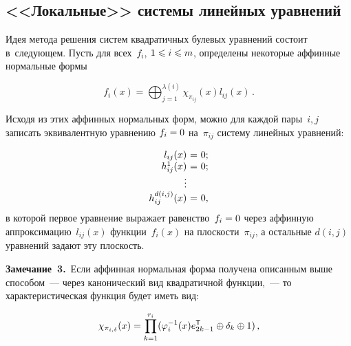 \begin{multicols}{2}
\section{<<Локальные>> системы линейных уравнений}

\vspace*{-2pt}

Идея метода решения систем квадратичных булевых уравнений состоит в~следующем.
Пусть для всех~$f_i$, $1\hm\leqslant i\hm\leqslant m$, 
определены некоторые аффинные нормальные 
формы

\vspace*{1pt}

\noindent
\begin{equation*}
\label{AffNF_ij}
    f_i(x) = \bigoplus_{j=1}^{\lambda(i)} \chi_{\pi_{ij}}(x)l_{ij}(x)\,.
\end{equation*}

\vspace*{-3pt}

\noindent
Исходя из этих аффинных нормальных форм, можно для каждой пары~$i,j$ записать 
эквивалентную уравнению $f_i\hm=0$ на~$\pi_{ij}$ систему линейных уравнений:

\columnbreak

\noindent
\begin{equation*}
    \begin{array}{r@{\ }c@{\ }l}
        l_{ij}(x)&=&0;\\
        h_{ij}^1(x)&=&0;\\
        \vdots\\
        h_{ij}^{d(i,j)}(x)&=&0,\\
    \end{array}
  \label{approx}
\end{equation*}
в которой первое уравнение выражает равенство~$f_i\hm=0$ через аффинную 
аппроксимацию~$l_{ij}(x)$ функции~$f_i(x)$ на плоскости~$\pi_{ij}$, а остальные 
$d(i,j)$ уравнений задают эту плоскость.


\smallskip

\noindent
\textbf{Замечание~3.}\
Если аффинная нормальная форма получена описанным выше способом~--- через 
канонический вид квадратичной функции,~--- то характеристическая функция будет 
иметь вид:

\vspace*{1pt}

\noindent
$$
\chi_{\pi_{i,\delta}}(x)=\prod_{k=1}^{r_i}(\varphi_i^{-1}(x)e_{2k-1}
^{\mathsf T}\oplus\delta_k\oplus 1)\,,
$$

\vspace*{-3pt}


\end{multicols}
